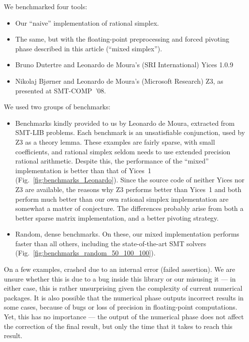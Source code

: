 We benchmarked four tools:
\begin{itemize}
\item Our ``naive'' implementation of rational simplex.
\item The same, but with the floating-point preprocessing and forced pivoting phase described in this article (``mixed simplex'').
\item Bruno Dutertre and Leonardo de Moura's (SRI International) Yices 1.0.9
\item Nikolaj Bj{\o}rner and Leonardo de Moura's (Microsoft Research) Z3,
  as presented at SMT-COMP~'08.
\end{itemize}

We used two groups of benchmarks:
\begin{itemize}
\item Benchmarks kindly provided to us by Leonardo de Moura, extracted from SMT-LIB problems. Each benchmark is an unsatisfiable conjunction, used by Z3 as a theory lemma. These examples are fairly sparse, with small coefficients, and rational simplex seldom needs to use extended precision rational arithmetic. Despite this, the performance of the ``mixed'' implementation is better than that of Yices~1 (Fig.~\ref{fig:benchmarks_Leonardo}). Since the source code of neither Yices nor Z3 are available, the reasons why Z3 performs better than Yices~1 and both perform much better than our own rational simplex implementation are somewhat a matter of conjecture. The differences probably arise from both a better sparse matrix implementation, and a better pivoting strategy.

\item Random, dense benchmarks. On these, our mixed implementation performs faster than all others, including the state-of-the-art SMT solvers (Fig.~\ref{fig:benchmarks_random_50_100_100}).
\end{itemize}

On a few examples,  crashed due to an internal error (failed assertion). We are unsure whether this is due to a bug inside this library or our misusing it --- in either case, this is rather unsurprising given the complexity of current numerical packages. It is also possible that the numerical phase outputs incorrect results in some cases, because of bugs or loss of precision in floating-point computations. Yet, this has no importance --- the output of the numerical phase does not affect the correction of the final result, but only the time that it takes to reach this result.

